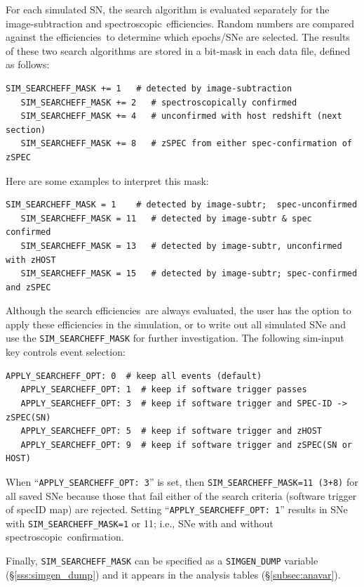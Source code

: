 \documentclass[12pt]{article}
\newcommand{\effs}{efficiencies}
\newcommand{\spec}{spectroscopic}
\begin{document}
{\bigskip
For each simulated SN, the search algorithm
is evaluated separately for the image-subtraction
and \spec\ \effs. Random numbers are compared against
the \effs\ to determine which epochs/SNe are selected.
The results of these two search algorithms are stored
in a bit-mask in each data file, defined as follows:

\clearpage
\begin{Verbatim}[frame=single]
   SIM_SEARCHEFF_MASK += 1   # detected by image-subtraction
   SIM_SEARCHEFF_MASK += 2   # spectroscopically confirmed
   SIM_SEARCHEFF_MASK += 4   # unconfirmed with host redshift (next section)
   SIM_SEARCHEFF_MASK += 8   # zSPEC from either spec-confirmation of zSPEC
\end{Verbatim}
%
Here are some examples to interpret this mask:
%
\begin{Verbatim}[frame=single]
   SIM_SEARCHEFF_MASK = 1    # detected by image-subtr;  spec-unconfirmed
   SIM_SEARCHEFF_MASK = 11   # detected by image-subtr & spec confirmed
   SIM_SEARCHEFF_MASK = 13   # detected by image-subtr, unconfirmed with zHOST
   SIM_SEARCHEFF_MASK = 15   # detected by image-subtr; spec-confirmed and zSPEC
\end{Verbatim}
%
Although the search \effs\ are always evaluated, the user has
the option to apply these efficiencies in the simulation,
or to write out all simulated SNe and use the 
{\tt SIM\_SEARCHEFF\_MASK} for further investigation.
The following sim-input key controls event selection:
%
\begin{Verbatim}[frame=single]
   APPLY_SEARCHEFF_OPT: 0  # keep all events (default)
   APPLY_SEARCHEFF_OPT: 1  # keep if software trigger passes
   APPLY_SEARCHEFF_OPT: 3  # keep if software trigger and SPEC-ID -> zSPEC(SN)
   APPLY_SEARCHEFF_OPT: 5  # keep if software trigger and zHOST
   APPLY_SEARCHEFF_OPT: 9  # keep if software trigger and zSPEC(SN or HOST)
\end{Verbatim}
%
When ``{\tt APPLY\_SEARCHEFF\_OPT: 3}'' is set,
then {\tt SIM\_SEARCHEFF\_MASK=11 (3+8)} for all saved SNe
because those that fail either of the search 
criteria (software trigger of specID map) are rejected. 
Setting  ``{\tt APPLY\_SEARCHEFF\_OPT: 1}'' results
in SNe with {\tt SIM\_SEARCHEFF\_MASK=1} or 11;
i.e., SNe with and without \spec\ confirmation.


Finally, {\tt SIM\_SEARCHEFF\_MASK} can be specified 
as a {\tt SIMGEN\_DUMP} variable (\S\ref{sss:simgen_dump}) 
and it appears in the analysis tables (\S\ref{subsec:anavar}).


}
\end{document}
